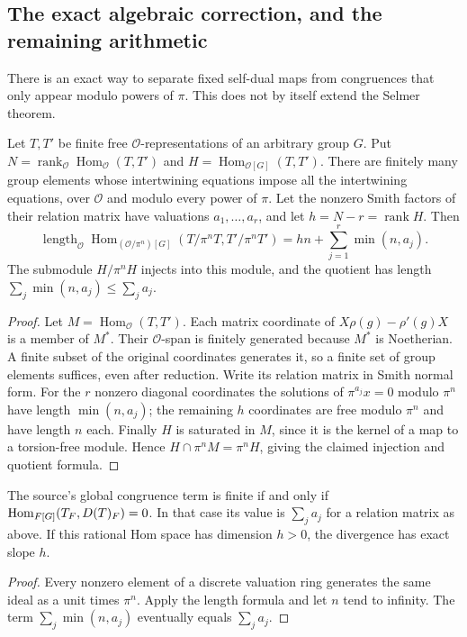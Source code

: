 \subsection{The exact algebraic correction, and the remaining arithmetic}

There is an exact way to separate fixed self-dual maps from congruences
that only appear modulo powers of $\pi$.  This does not by itself extend
the Selmer theorem.

\begin{proposition}
Let $T,T'$ be finite free $\mathcal O$-representations of an arbitrary
group $G$.  Put $N=\operatorname{rank}_{\mathcal O}
\operatorname{Hom}_{\mathcal O}(T,T')$ and
$H=\operatorname{Hom}_{\mathcal O[G]}(T,T')$.
There are finitely many group elements whose intertwining equations
impose all the intertwining equations, over $\mathcal O$ and modulo every
power of $\pi$.  Let the nonzero Smith factors of their relation matrix
have valuations $a_1,\dots,a_r$, and let $h=N-r=\operatorname{rank}H$.
Then
\[
 \operatorname{length}_{\mathcal O}
 \operatorname{Hom}_{(\mathcal O/\pi^n)[G]}
      (T/\pi^nT,T'/\pi^nT')
 =hn+\sum_{j=1}^r\min(n,a_j).
\]
The submodule $H/\pi^nH$ injects into this module, and the quotient has
length $\sum_j\min(n,a_j)\le\sum_j a_j$.
\end{proposition}
\begin{proof}
Let $M=\operatorname{Hom}_{\mathcal O}(T,T')$.
Each matrix coordinate of
$X\rho(g)-\rho'(g)X$ is a member of $M^*$.
Their $\mathcal O$-span is finitely generated because $M^*$ is
Noetherian.  A finite subset of the original coordinates generates it,
so a finite set of group elements suffices, even after reduction.
Write its relation matrix in Smith normal form.  For the $r$ nonzero
diagonal coordinates the solutions of $\pi^{a_j}x=0$ modulo $\pi^n$
have length $\min(n,a_j)$; the remaining $h$ coordinates are free modulo
$\pi^n$ and have length $n$ each.
Finally $H$ is saturated in $M$, since it is the kernel of a map to a
torsion-free module.  Hence $H\cap\pi^nM=\pi^nH$, giving the claimed
injection and quotient formula.
\end{proof}

\begin{corollary}
The source's global congruence term is finite if and only if
$\operatorname{Hom}_{F[G]}(T_F,D(T)_F)=0$. In that case its value is
$\sum_j a_j$ for a relation matrix as above. If this rational Hom space
has dimension $h>0$, the divergence has exact slope $h$.
\end{corollary}
\begin{proof}
Every nonzero element of a discrete valuation ring generates the same
ideal as a unit times $\pi^n$. Apply the length formula and let $n$ tend
to infinity. The term $\sum_j\min(n,a_j)$ eventually equals $\sum_j a_j$.
\end{proof}

